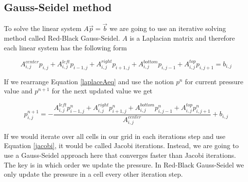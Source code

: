 \subsection{Gauss-Seidel method}

To solve the linear system $A\vec{p} = \vec{b}$ we are going to use an iterative solving method called Red-Black Gauss-Seidel. $A$ is a Laplacian matrix and therefore each linear system has the following form

\begin{equation}
{A}^{center}_{i,j} p_{i,j} + {A}^{left}_{i,j} p_{i-1,j} + {A}^{right}_{i,j} p_{i+1,j} + {A}^{bottom}_{i,j} p_{i,j-1} + {A}^{top}_{i,j} p_{i,j+1} = b_{i,j}
\label{laplaceAeq}
\end{equation}

If we rearrange Equation \ref{laplaceAeq} and use the notion $p^n$ for current pressure value and $p^{n+1}$ for the next updated value we get

\begin{equation}
{p}^{n+1}_{i,j}  = -\frac{ {A}^{left}_{i,j} {p}^{n}_{i-1,j} + {A}^{right}_{i,j} {p}^{n}_{i+1,j} + {A}^{bottom}_{i,j} {p}^{n}_{i,j-1} + {A}^{top}_{i,j} {p}^{n}_{i,j+1}}{{A}^{center}_{i,j}} + b_{i,j}
\label{jacobi}
\end{equation}

If we would iterate over all cells in our grid in each iterations step and use Equation \ref{jacobi}, it would be called Jacobi iterations. Instead, we are going to use a Gauss-Seidel approach here that converges faster than Jacobi iterations. The key is in which order we update the pressure. In Red-Black Gauss-Seidel we only update the pressure in a cell every other iteration step. 
